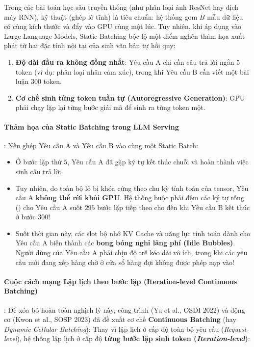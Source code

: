 Trong các bài toán học sâu truyền thống (như phân loại ảnh ResNet hay dịch máy RNN), kỹ thuật  (ghép lô tĩnh) là tiêu chuẩn: hệ thống gom $B$ mẫu dữ liệu có cùng kích thước và đẩy vào GPU cùng một lúc. Tuy nhiên, khi áp dụng vào Large Language Models, Static Batching bộc lộ một điểm nghẽn thảm họa xuất phát từ hai đặc tính nội tại của sinh văn bản tự hồi quy:
\begin{enumerate}
  \item \textbf{Độ dài đầu ra không đồng nhất}: Yêu cầu A chỉ cần câu trả lời ngắn $5$ token (ví dụ: phân loại nhãn cảm xúc), trong khi Yêu cầu B cần viết một bài luận $300$ token.
  \item \textbf{Cơ chế sinh từng token tuần tự (Autoregressive Generation)}: GPU phải chạy lặp lại từng bước giải mã để sinh ra từng token một.
\end{enumerate}

\paragraph{Thảm họa của Static Batching trong LLM Serving}:
Nếu ghép Yêu cầu A và Yêu cầu B vào cùng một Static Batch:
\begin{itemize}
  \item Ở bước lặp thứ $5$, Yêu cầu A đã gặp ký tự kết thúc chuỗi  và hoàn thành việc sinh câu trả lời.
  \item Tuy nhiên, do toàn bộ lô bị khóa cứng theo chu kỳ tính toán của tensor, Yêu cầu A \textbf{không thể rời khỏi GPU}. Hệ thống buộc phải đệm các ký tự rỗng () cho Yêu cầu A suốt $295$ bước lặp tiếp theo cho đến khi Yêu cầu B kết thúc ở bước $300$!
  \item Suốt thời gian này, các slot bộ nhớ KV Cache và năng lực tính toán dành cho Yêu cầu A biến thành các \textbf{bong bóng nghỉ lãng phí (Idle Bubbles)}. Người dùng của Yêu cầu A phải chịu độ trễ kéo dài vô ích, trong khi các yêu cầu mới đang xếp hàng chờ ở cửa sổ hàng đợi không được phép nạp vào!
\end{itemize}

\paragraph{Cuộc cách mạng Lập lịch theo bước lặp (Iteration-level Continuous Batching)}:
Để xóa bỏ hoàn toàn nghịch lý này, công trình  (Yu et al., OSDI 2022) và động cơ  (Kwon et al., SOSP 2023) đã đề xuất cơ chế \textbf{Continuous Batching} (hay \textit{Dynamic Cellular Batching}):
Thay vì lập lịch ở cấp độ toàn bộ yêu cầu (\textit{Request-level}), hệ thống lập lịch ở cấp độ \textbf{từng bước lặp sinh token (\textit{Iteration-level})}:


